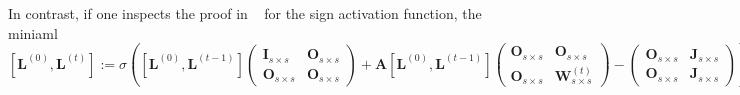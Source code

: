 In contrast, if one inspects the proof in
~\cite{grohewl} for the sign activation function, the miniaml
$$
[\mathbf{L}^{(0)},\mathbf{L}^{(t)}]:=\sigma\left([\mathbf{L}^{(0)},\mathbf{L}^{(t-1)}]\begin{pmatrix}
\mathbf{I}_{s\times s} & \mathbf{O}_{s\times s}\\
\mathbf{O}_{s\times s} & \mathbf{O}_{s\times s}\end{pmatrix}
+\mathbf{A}[\mathbf{L}^{(0)},\mathbf{L}^{(t-1)}]
\begin{pmatrix}
\mathbf{O}_{s\times s} & \mathbf{O}_{s\times s}\\
\mathbf{O}_{s\times s} & \mathbf{W}_{s\times s}^{(t)}\end{pmatrix}-
\begin{pmatrix}
\mathbf{O}_{s\times s} & \mathbf{J}_{s\times s}\\
\mathbf{O}_{s\times s} & \mathbf{J}_{s\times s}\end{pmatrix}
\right).
$$
